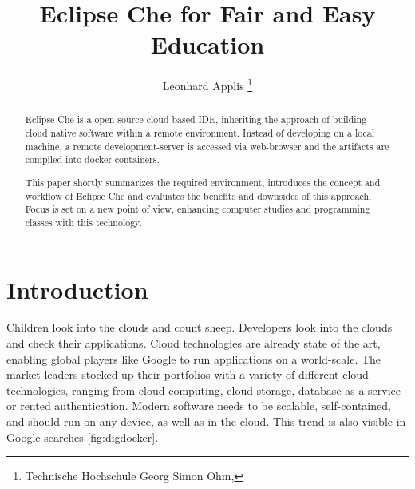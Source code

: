 \documentclass[english,utf8]{lni}
\begin{document}
\title[Eclipse Che for Education]{Eclipse Che for Fair and Easy Education}
\author[Leonhard Applis]
{Leonhard Applis \footnote{Technische Hochschule Georg Simon Ohm, }}
\maketitle

\begin{abstract}
Eclipse Che is a open source cloud-based IDE, inheriting the approach of building cloud native software within a 
remote environment. 
Instead of developing on a local machine, a remote development-server is accessed via web-browser 
and the artifacts are compiled into docker-containers. 

This paper shortly summarizes the required environment, introduces the concept and workflow of Eclipse Che and evaluates 
the benefits and downsides of this approach. 
Focus is set on a new point of view, enhancing computer studies and 
programming classes with this technology. 
\end{abstract}


\section{Introduction}
\label{sec:Introduction}
Children look into the clouds and count sheep. 
Developers look into the clouds and check their applications.  
Cloud technologies are already state of the art, enabling global players like Google to run applications on a world-scale.
The market-leaders stocked up their portfolios with  a  variety  of  different  cloud  technologies,  ranging from cloud computing, cloud storage, database-as-a-service or rented authentication. 
Modern software needs to be scalable, self-contained, and should run on any device, as well as in the cloud.  
This trend is also visible in Google searches \ref{fig:digdocker}. 
\end{document}
